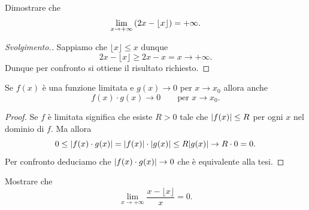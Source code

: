 \begin{example}
  Dimostrare che 
  \[
    \lim_{x\to +\infty} {\left( 2x - \lfloor x\rfloor \right)} = +\infty. 
  \]
\end{example}
\begin{proof}[Svolgimento.]
  Sappiamo che $\lfloor x\rfloor \le x$ dunque 
  \[
    2x - \lfloor x \rfloor \ge 2x -x = x \to +\infty.  
  \]
  Dunque per confronto si ottiene il risultato richiesto.
\end{proof}

\begin{corollary}%
\label{cor:limitata_per_infinitesima}%
\mymark{**}%
  Se $f(x)$ è una funzione limitata e $g(x)\to 0$ per 
  $x\to x_0$ allora anche
  \[
    f(x)\cdot g(x) \to 0 \qquad \text{per $x\to x_0.$} 
  \]
\end{corollary}
%
\begin{proof}
  Se $f$ è limitata significa che esiste $R>0$ tale che ${\left|f(x)\right|}\le R$
  per ogni $x$ nel dominio di $f$.
  Ma allora 
  \[
     0\le {\left|f(x)\cdot g(x)\right|} = {\left|f(x)\right|}\cdot {\left|g(x)\right|} 
     \le R {\left|g(x)\right|} \to R\cdot 0 = 0.
  \]
  Per confronto deduciamo che ${\left|f(x)\cdot g(x)\right|}\to 0$ 
  che è equivalente alla tesi.
\end{proof}

\begin{exercise}
  Mostrare che 
  \[
   \lim_{x\to +\infty} \frac{x-\lfloor x \rfloor}{x} = 0.  
  \]
\end{exercise}
%

